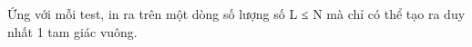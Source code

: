 Ứng với mỗi test, in ra trên một dòng số lượng số L ≤ N mà chỉ có thể tạo ra duy nhất 1 tam giác vuông.

\